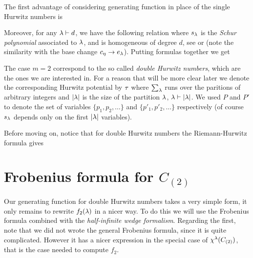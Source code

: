 \documentclass[../main/main.tex]{subfiles}
\begin{document}
The first advantage of considering generating function in place of the single Hurwitz numbers is 

\begin{theorem}[{\cite[Thm. 10.2.1]{CM}}]
\end{theorem}

Moreover, for any $\lambda\vdash d$, we have the following relation 
where $s_\lambda$ is the \emph{Schur polynomial} associated to $\lambda$, and is homogeneous of degree $d$, see \cite[§A, Prop. 4.37, Ex. A.29]{FH} or \cite[Part I]{M} (note the similarity with the base change $c_\eta\to e_\lambda$). Putting formulas together we get

The case $m=2$ correspond to the so called \emph{double Hurwitz numbers}, which are the ones we are interested in. For a reason that will be more clear later we denote the corresponding Hurwitz potential by $\tau$
where $\sum_\lambda$ runs over the paritions of arbitrary integers and $|\lambda|$ is the size of the partition $\lambda$, $\lambda\vdash|\lambda|$. We used $P$ and $P'$ to denote the set of variables $\{p_1,p_2,\ldots\}$ and $\{p'_1,p'_2,\ldots\}$ respectively (of course $s_\lambda$ depends only on the first $|\lambda|$ variables). 

Before moving on, notice that for double Hurwitz numbers the Riemann-Hurwitz formula gives

\section{Frobenius formula for $C_{(2)}$}

Our generating function for double Hurwitz numbers takes a very simple form, it only remains to rewrite $f_2(\lambda)$ in a nicer way. To do this we will use the Frobenius formula combined with the \emph{half-infinite wedge formalism}. Regarding the first, note that we did not wrote the general Frobenius formula, since it is quite complicated. However it has a nicer expression in the special case of $\chi^\lambda(C_{(2)})$, that is the case needed to compute $f_2$.
\end{document}
